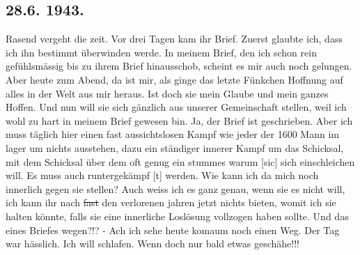 \subsection{28.6. 1943.}

Rasend vergeht die zeit.
Vor drei Tagen kam ihr Brief.
Zuerst glaubte ich, dass ich ihn bestimmt \"{u}berwinden werde.
In meinem Brief, den ich schon rein gef\"{u}hlsm\"{a}ssig bis zu ihrem Brief hinausschob, scheint es mir auch noch gelungen.
Aber heute zum Abend, da ist mir, als ginge das letzte F\"{u}nkchen Hoffnung auf alles in der Welt aus mir heraus.
Ist  doch sie mein Glaube und mein ganzes Hoffen.
Und nun will sie sich g\"{a}nzlich aus unserer Gemeinschaft stellen, weil ich wohl zu hart in meinem Brief gewesen bin.
Ja, der Brief ist geschrieben.
Aber ich muss t\"{a}glich hier einen fast aussichtslosen Kampf wie jeder der 1600 Mann im lager um nichts ausstehen, dazu ein st\"{a}ndiger innerer Kampf um das Schicksal, mit dem Schicksal \"{u}ber dem oft genug ein stummes warum{\color{red} [sic] } sich einschleichen will.
Es muss auch runtergek\"{a}mpf{\color{red} [t] } werden.
Wie kann ich da mich noch innerlich gegen sie stellen?
Auch weiss ich es ganz genau, wenn sie es nicht will, ich kann ihr nach \st{fast} den verlorenen jahren jetzt nichts bieten, womit ich sie halten k\"{o}nnte, falls sie eine innerliche Losl\"{o}sung vollzogen haben sollte.
Und das eines Briefes wegen?!? -
Ach ich sehe heute komaum noch einen Weg.
Der Tag war h\"{a}sslich.
Ich will schlafen.
Wenn doch nur bald etwas gesch\"{a}he!!!

\clearpage
